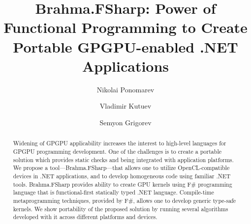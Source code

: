 \documentclass[runningheads]{llncs}
\begin{document}
%
\title{Brahma.FSharp: Power of Functional Programming to Create Portable GPGPU-enabled .NET Applications}
%
%
\author{Nikolai Ponomarev \and
Vladimir Kutuev \and
Semyon Grigorev}
%
%
%
\maketitle              %
%
\begin{abstract}
Widening of GPGPU applicability increases the interest to high-level languages for GPGPU programming development.
One of the challenges is to create a portable solution which provides static checks and being integrated with application platforms.
We propose a tool---Brahma.FSharp---that allows one to utilize OpenCL-compatible devices in .NET applications, and to develop homogeneous code using familiar .NET tools.
Brahma.FSharp provides ability to create GPU kernels using F\# programming language that is functional-first statically typed .NET language.
Compile-time metaprogramming techniques, provided by F\#, allows one to develop generic type-safe kernels.
We show portability of the proposed solution by running several algorithms developed with it across different platforms and devices.
    
\end{abstract}


%



%



\end{document}
